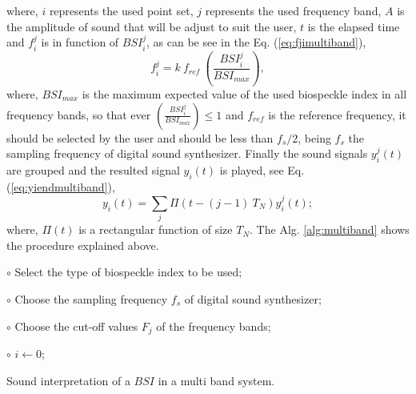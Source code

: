 \documentclass[review]{elsarticle}
\begin{document}
where, $i$ represents the used point set, $j$ represents the used frequency band,
$A$ is the amplitude of sound that will be adjust to suit the user, $t$ is the elapsed time
and $f^j_i$ is in function of $BSI^j_i$, as
can be see in the Eq. (\ref{eq:fjimultiband}),
\begin{equation}\label{eq:fjimultiband}
 f^j_{i}=k~f_{ref}~\left( \frac{BSI^j_i}{BSI_{max}} \right),
\end{equation}
where, $BSI_{max}$ is the maximum expected value of the used biospeckle index in all frequency bands, so that 
ever $\left( \frac{BSI^j_i}{BSI_{max}} \right) \leq 1$ and
$f_{ref}$ is the reference frequency, it should be selected by the user and should be less than $f_s/2$, being $f_s$
the sampling frequency of digital sound synthesizer.
Finally the sound signals $y^j_i(t)$ are grouped and the resulted signal $y_i(t)$ is played, see Eq. (\ref{eq:yiendmultiband}),
\begin{equation}\label{eq:yiendmultiband}
 y_i(t)= \sum_j \varPi\left(t-(j-1)~T_N\right) y^j_i(t);
\end{equation}
where, $\varPi\left(t\right)$ is a rectangular function of size $T_N$.
The Alg. \ref{alg:multiband} shows the procedure explained above.

\begin{algorithm}

 $\circ$ Select the type of biospeckle index to be used;
  
 $\circ$ Choose the  sampling frequency $f_s$ of digital sound synthesizer;
 
 $\circ$ Choose the cut-off values $F_j$ of the frequency bands;
 
 $\circ$ $i \leftarrow 0$;
 ~\\
 \caption{Sound interpretation of a $BSI$ in a multi band system.}
 \label{alg:multiband} 
\end{algorithm}
\end{document}
